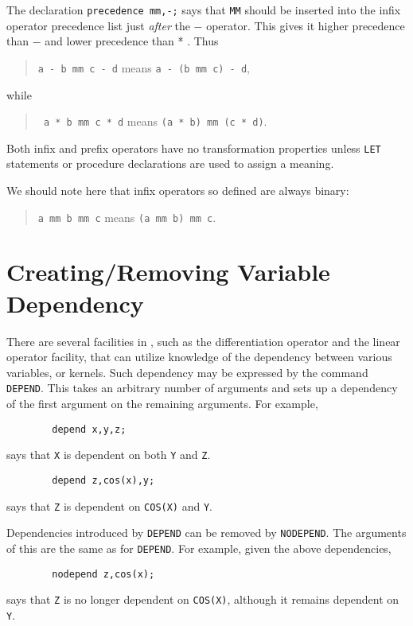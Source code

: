 The declaration \texttt{precedence mm,-;} says that \texttt{MM} should be
inserted into the infix operator precedence list just {\em after\/}
the $-$ operator.  This gives it higher precedence than $-$ and lower
precedence than * .  Thus

\begin{quote}
\hspace{0.2in}\texttt{a - b mm c - d}\hspace{.3in} means \hspace{.3in}
\texttt{a - (b mm c) - d},
\end{quote}
while
\begin{quote}
\hspace{0.2in}\texttt{  a * b mm c * d}\hspace{.3in} means \hspace{.3in}
\texttt{(a * b) mm (c * d)}.
\end{quote}

Both infix and prefix operators have no transformation
properties unless \texttt{LET} statements or procedure
declarations are used to assign a meaning.

We should note here that infix operators so defined are always binary:
\begin{quote}
\hspace{0.2in}\texttt{a mm b mm c}\hspace{.3in} means \hspace{.3in}
\texttt{(a mm b) mm c}.
\end{quote}

\section{Creating/Removing Variable Dependency}
\hypertarget{command:DEPEND}{}
\hypertarget{command:NODEPEND}{}

There are several facilities in {\REDUCE}, such as the differentiation
operator and the linear operator facility, that
can utilize knowledge of the dependency between various variables, or
kernels.  Such dependency may be expressed by the command \texttt{DEPEND}. 
This takes an arbitrary number of arguments and
sets up a dependency of the first argument on the remaining arguments.
For example,
\begin{verbatim}
        depend x,y,z;
\end{verbatim}
says that \texttt{X} is dependent on both \texttt{Y} and \texttt{Z}.
\begin{verbatim}
        depend z,cos(x),y;
\end{verbatim}
says that \texttt{Z} is dependent on \texttt{COS(X)} and \texttt{Y}.

Dependencies introduced by \texttt{DEPEND} can be removed by \texttt{NODEPEND}.
 The arguments of this are the same as for \texttt{DEPEND}.
For example, given the above dependencies,
\begin{verbatim}
        nodepend z,cos(x);
\end{verbatim}
says that \texttt{Z} is no longer dependent on \texttt{COS(X)}, although it remains
dependent on \texttt{Y}.

